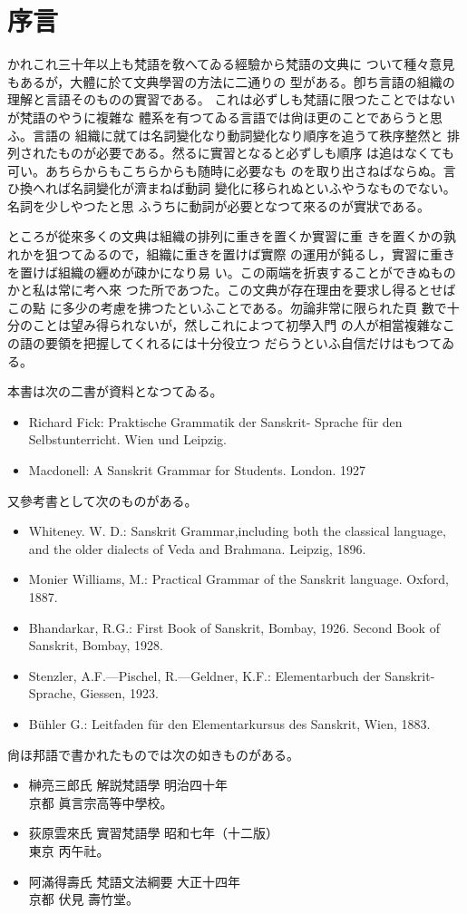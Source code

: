 \chapter*{序言}
\label{cha:preface}
かれこれ三十年以上も梵語を敎へてゐる經驗から梵語の文典に
ついて種々意見もあるが，大體に於て文典學習の方法に二通りの
型がある。卽ち言語の組織の理解と言語そのものの實習である。
これは必ずしも梵語に限つたことではないが梵語のやうに複雜な
體系を有つてゐる言語では尙ほ更のことであらうと思ふ。言語の
組織に就ては名詞變化なり動詞變化なり順序を追うて秩序整然と
排列されたものが必要である。然るに實習となると必ずしも順序
は追はなくても可い。あちらからもこちらからも随時に必要なも
のを取り出さねばならぬ。言ひ換へれば名詞變化が濟まねば動詞
變化に移られぬといふやうなものでない。名詞を少しやつたと思
ふうちに動詞が必要となつて來るのが實狀である。

ところが從來多くの文典は組織の排列に重きを置くか實習に重
きを置くかの孰れかを狙つてゐるので，組織に重きを置けば實際
の運用が鈍るし，實習に重きを置けば組織の纒めが疎かになり易
い。この兩端を折衷することができぬものかと私は常に考へ來
つた所であつた。この文典が存在理由を要求し得るとせばこの點
に多少の考慮を拂つたといふことである。勿論非常に限られた頁
數で十分のことは望み得られないが，然しこれによつて初學入門
の人が相當複雜なこの語の要領を把握してくれるには十分役立つ
だらうといふ自信だけはもつてゐる。

本書は次の二書が資料となつてゐる。
\begin{itemize}
\item Richard Fick: Praktische Grammatik der Sanskrit-
Sprache für den Selbstunterricht. Wien und Leipzig.
\item Macdonell: A Sanskrit Grammar for Students. London. 1927
\end{itemize}

又參考書として次のものがある。
\begin{itemize}
\item Whiteney. W. D.: Sanskrit Grammar,including both the
classical language, and the older dialects of Veda and Brahmana. Leipzig, 1896.
\item Monier Williams, M.: Practical Grammar of the San\-skrit language. Oxford, 1887.
\item Bhandarkar, R.G.: First Book of Sanskrit, Bombay, 1926. Second Book of Sanskrit, Bombay, 1928.
\item Stenzler, A.F.---Pischel, R.---Geldner, K.F.: Elementar\-buch der Sanskrit-Sprache, Giessen, 1923.
\item Bühler G.: Leitfaden für den Elementarkursus des Sanskrit, Wien, 1883.
\end{itemize}

尙ほ邦語で書かれたものでは次の如きものがある。
\begin{itemize}
\item 榊亮三郎氏 解説梵語學 明治四十年\\
\hfil 京都 眞言宗高等中學校。
\item 荻原雲來氏 實習梵語學 昭和七年（十二版）\\
\hfil 東京 丙午社。
\item 阿滿得壽氏 梵語文法綱要 大正十四年\\
\hfil 京都 伏見 壽竹堂。
\end{itemize}

